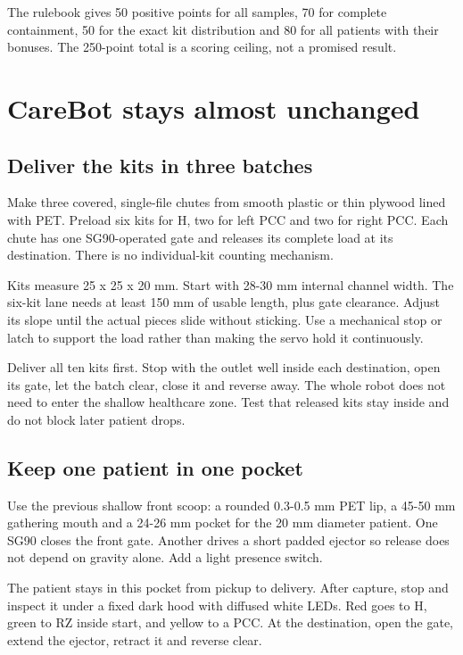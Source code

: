 \documentclass[10pt,a4paper]{article}
\begin{document}
The rulebook gives 50 positive points for all samples, 70 for complete containment, 50 for the exact kit distribution and 80 for all patients with their bonuses. The 250-point total is a scoring ceiling, not a promised result.

\section{CareBot stays almost unchanged}
\subsection{Deliver the kits in three batches}
Make three covered, single-file chutes from smooth plastic or thin plywood lined with PET. Preload six kits for H, two for left PCC and two for right PCC. Each chute has one SG90-operated gate and releases its complete load at its destination. There is no individual-kit counting mechanism.

Kits measure 25 x 25 x 20 mm. Start with 28-30 mm internal channel width. The six-kit lane needs at least 150 mm of usable length, plus gate clearance. Adjust its slope until the actual pieces slide without sticking. Use a mechanical stop or latch to support the load rather than making the servo hold it continuously.

Deliver all ten kits first. Stop with the outlet well inside each destination, open its gate, let the batch clear, close it and reverse away. The whole robot does not need to enter the shallow healthcare zone. Test that released kits stay inside and do not block later patient drops.

\subsection{Keep one patient in one pocket}
Use the previous shallow front scoop: a rounded 0.3-0.5 mm PET lip, a 45-50 mm gathering mouth and a 24-26 mm pocket for the 20 mm diameter patient. One SG90 closes the front gate. Another drives a short padded ejector so release does not depend on gravity alone. Add a light presence switch.

The patient stays in this pocket from pickup to delivery. After capture, stop and inspect it under a fixed dark hood with diffused white LEDs. Red goes to H, green to RZ inside start, and yellow to a PCC. At the destination, open the gate, extend the ejector, retract it and reverse clear.
\end{document}
